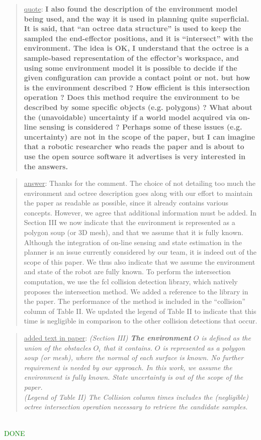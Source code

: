 \documentclass[a4paper]{article}
\newcommand{\done}[0]{\textcolor{green}{DONE}}
\newcommand\quot[1]{\begin{quote} \underline{quote}: \textbf{#1}\end{quote}}
\newcommand\as[1]{\begin{quote} \underline{answer}: {#1}\end{quote} }
\newcommand\qt[1]{\begin{quote} \underline{added text in paper}: \textit{#1}\end{quote} \leavevmode \\ }
\begin{document}
\quot{ I also found the description of the environment model being
used,
and the way it is used in planning quite superficial. It is said, that
``an octree data structure'' is used to keep the sampled the
end-effector positions, and it is ``intersect'' with the environment.
The idea is OK, I understand that the octree is a sample-based
representation of the effector's workspace, and using some environment
model it is possible to decide if the given configuration can provide a
contact point or not. but how is the environment described ? How
efficient is this intersection operation ? Does this method require the
environment to be described by some specific objects (e.g. polygons) ?
What about the (unavoidable) uncertainty if a world model acquired via
on-line sensing is considered ? Perhaps some of these issues (e.g.
uncertainty) are not in the scope of the paper, but I can imagine that
a robotic researcher who reads the paper and is about to use the open
source software it advertises is very interested in the answers.}

\as{Thanks for the comment. The choice of not detailing too much the environment and octree description goes along with 
our effort to maintain the paper as readable as possible, since it already contains various concepts. However,
we agree that additional information must be added. In Section III we now indicate that the environment is represented as a polygon soup (or 3D mesh), and
that we assume that it is fully known. Although the integration of on-line sensing and state estimation in the planner is an issue currently considered by our team, it is indeed
out of the scope of this paper. We thus also indicate that we assume the environment and state of the robot are fully known. To perform the intersection computation, we use
the fcl collision detection library, which natively proposes the intersection method. We added a reference to the library in the paper. The performance of the method is included
in the ``collision'' column of Table II. We updated the legend of Table II to indicate that this time is negligible in comparison to the other collision detections that occur.
} 
\qt{(Section III) \textbf{The environment} $O$ is defined as the union of the obstacles $O_i$ that it contains. $O$ is represented
as a polygon soup (or mesh), where the normal of each surface is known. No further requirement is needed
by our approach. In this work, we assume the environment is fully known. State uncertainty is out of the scope of the paper. \\
(Legend of Table II)  The Collision column times includes the (negligible) octree intersection operation necessary to retrieve the candidate samples.}
\done
\end{document}
